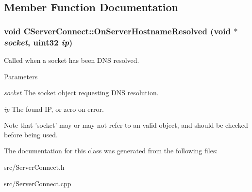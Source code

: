 \subsection{Member Function Documentation}
\subsubsection[{OnServerHostnameResolved}]{\setlength{\rightskip}{0pt plus 5cm}void CServerConnect::OnServerHostnameResolved (void $\ast$ {\em socket}, \/  uint32 {\em ip})}\label{classCServerConnect_ac4c4d3192b6fc3cc006d15187d997864}


Called when a socket has been DNS resolved. 
\begin{DoxyParams}{Parameters}
\item[{\em socket}]The socket object requesting DNS resolution. \item[{\em ip}]The found IP, or zero on error.\end{DoxyParams}
Note that 'socket' may or may not refer to an valid object, and should be checked before being used. 

The documentation for this class was generated from the following files:\begin{DoxyCompactItemize}
\item 
src/ServerConnect.h\item 
src/ServerConnect.cpp\end{DoxyCompactItemize}
